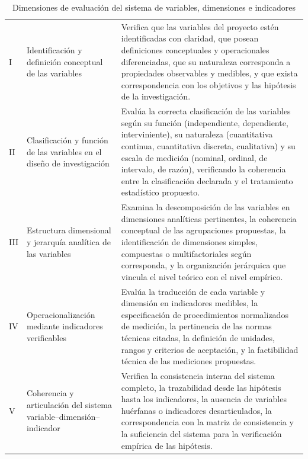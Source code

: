 \begin{table}[htbp]
\centering
\scriptsize
\caption{Dimensiones de evaluación del sistema de variables, dimensiones e indicadores}
\label{tab:dim-variables}
\begin{tabularx}{\textwidth}{|C{0.6cm}|L{3cm}|X|}
\hline
{}
 &  &  \\ \hline
I & Identificación y definición conceptual de las variables & Verifica que las variables del proyecto estén identificadas con claridad, que posean definiciones conceptuales y operacionales diferenciadas, que su naturaleza corresponda a propiedades observables y medibles, y que exista correspondencia con los objetivos y las hipótesis de la investigación. \\ \hline
{}
II & Clasificación y función de las variables en el diseño de investigación & Evalúa la correcta clasificación de las variables según su función (independiente, dependiente, interviniente), su naturaleza (cuantitativa continua, cuantitativa discreta, cualitativa) y su escala de medición (nominal, ordinal, de intervalo, de razón), verificando la coherencia entre la clasificación declarada y el tratamiento estadístico propuesto. \\ \hline
III & Estructura dimensional y jerarquía analítica de las variables & Examina la descomposición de las variables en dimensiones analíticas pertinentes, la coherencia conceptual de las agrupaciones propuestas, la identificación de dimensiones simples, compuestas o multifactoriales según corresponda, y la organización jerárquica que vincula el nivel teórico con el nivel empírico. \\ \hline
{}
IV & Operacionalización mediante indicadores verificables & Evalúa la traducción de cada variable y dimensión en indicadores medibles, la especificación de procedimientos normalizados de medición, la pertinencia de las normas técnicas citadas, la definición de unidades, rangos y criterios de aceptación, y la factibilidad técnica de las mediciones propuestas. \\ \hline
V & Coherencia y articulación del sistema variable--dimensión--indicador & Verifica la consistencia interna del sistema completo, la trazabilidad desde las hipótesis hasta los indicadores, la ausencia de variables huérfanas o indicadores desarticulados, la correspondencia con la matriz de consistencia y la suficiencia del sistema para la verificación empírica de las hipótesis. \\ \hline
\end{tabularx}
\end{table}

